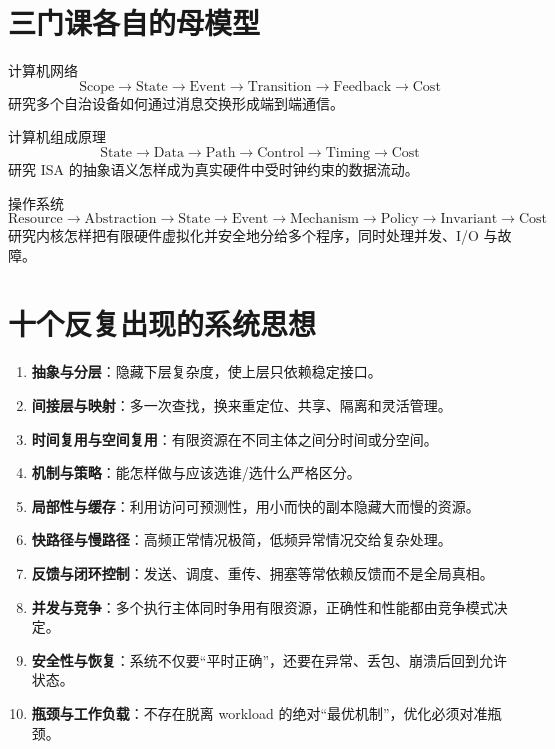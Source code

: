 \documentclass[11pt,a4paper,openany]{ctexbook}
\newcommand{\key}[1]{\textbf{\color{deep}#1}}
\begin{document}
\section{三门课各自的母模型}
\begin{corebox}{计算机网络}
\[
\boxed{\text{Scope}\rightarrow\text{State}\rightarrow\text{Event}\rightarrow\text{Transition}\rightarrow\text{Feedback}\rightarrow\text{Cost}}
\]
研究多个自治设备如何通过消息交换形成端到端通信。
\end{corebox}

\begin{corebox}{计算机组成原理}
\[
\boxed{\text{State}\rightarrow\text{Data}\rightarrow\text{Path}\rightarrow\text{Control}\rightarrow\text{Timing}\rightarrow\text{Cost}}
\]
研究 ISA 的抽象语义怎样成为真实硬件中受时钟约束的数据流动。
\end{corebox}

\begin{corebox}{操作系统}
\[
\boxed{\text{Resource}\rightarrow\text{Abstraction}\rightarrow\text{State}\rightarrow\text{Event}\rightarrow\text{Mechanism}\rightarrow\text{Policy}\rightarrow\text{Invariant}\rightarrow\text{Cost}}
\]
研究内核怎样把有限硬件虚拟化并安全地分给多个程序，同时处理并发、I/O 与故障。
\end{corebox}

\section{十个反复出现的系统思想}
\begin{enumerate}
  \item \key{抽象与分层}：隐藏下层复杂度，使上层只依赖稳定接口。
  \item \key{间接层与映射}：多一次查找，换来重定位、共享、隔离和灵活管理。
  \item \key{时间复用与空间复用}：有限资源在不同主体之间分时间或分空间。
  \item \key{机制与策略}：能怎样做与应该选谁/选什么严格区分。
  \item \key{局部性与缓存}：利用访问可预测性，用小而快的副本隐藏大而慢的资源。
  \item \key{快路径与慢路径}：高频正常情况极简，低频异常情况交给复杂处理。
  \item \key{反馈与闭环控制}：发送、调度、重传、拥塞等常依赖反馈而不是全局真相。
  \item \key{并发与竞争}：多个执行主体同时争用有限资源，正确性和性能都由竞争模式决定。
  \item \key{安全性与恢复}：系统不仅要“平时正确”，还要在异常、丢包、崩溃后回到允许状态。
  \item \key{瓶颈与工作负载}：不存在脱离 workload 的绝对“最优机制”，优化必须对准瓶颈。
\end{enumerate}
\end{document}
